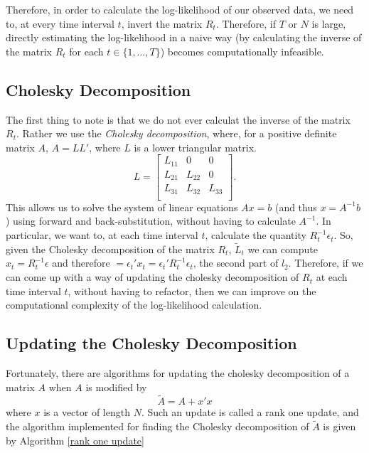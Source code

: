 \documentclass{article} %
\numberwithin{equation}{section} %
\numberwithin{figure}{section} %
\numberwithin{table}{section} %
\begin{document}
Therefore, in order to calculate the log-likelihood of our observed data, we need to, at every time interval $t$, invert the matrix $R_t$. Therefore, if $T$ or $N$ is large, directly estimating the log-likelihood in a naive way (by calculating the inverse of the matrix $R_t$ for each $t \in \{1, \ldots , T\}$) becomes computationally infeasible.

\subsection{Cholesky Decomposition}

The first thing to note is that we do not ever calculat the inverse of the matrix $R_t$. Rather we use the \textit{Cholesky decomposition}, where, for a positive definite matrix $A$, $A = LL'$, where $L$ is a lower triangular matrix.
\begin{equation}
  L=
    \begin{bmatrix}
      L_{11} & 0      & 0       \\
      L_{21} & L_{22} & 0       \\
      L_{31} & L_{32} & L_{33}  \\
    \end{bmatrix}.
\end{equation}
This allows us to solve the system of linear equations $Ax = b$ (and thus $x = A^{-1}b$) using forward and back-substitution, without having to calculate $A^{-1}$. In particular, we want to, at each time interval $t$, calculate the quantity $R_t^{-1}\epsilon_t$. So, given the Cholesky decomposition of the matrix $R_t$, $\tilde{L}_t$ we can compute $x_t = R_t^{-1}\epsilon$ and therefore $ = \epsilon_t'x_t = \epsilon_t'R_t^{-1}\epsilon_t$, the second part of $l_2$. Therefore, if we can come up with a way of updating the cholesky decomposition of $R_t$ at each time interval $t$, without having to refactor, then we can improve on the computational complexity of the log-likelihood calculation.

\subsection{Updating the Cholesky Decomposition}

Fortunately, there are algorithms for updating the cholesky decomposition of a matrix $A$ when $A$ is modified by
\begin{equation}
\tilde{A} = A + x'x
\end{equation}
where $x$ is a vector of length $N$. Such an update is called a rank one update, and the algorithm implemented for finding the Cholesky decomposition of $\tilde{A}$ is given by Algorithm \ref{rank one update}
\end{document}

